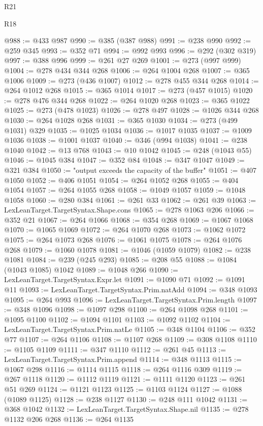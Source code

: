 \begin{lexlean}{R21}
\begin{lexlean}{R18}
\begin{coremodule}
{{{{{{{{{{{{{{{{{{{{{{{{{{{{{{{{{{{{{{{{{{{{{{{{{{{{{{{{{{{{{{{{{{{{{{{{{{{{{{{{{{{{{{{{{{{{{{{{{{{{{{{{{{{{{{{{{{{{{{{{{{{{{{{{{{{{{{{{{{{{{{{@988 := @433 @987
@990 := @385 (@387 @988)
@991 := @238 @990
@992 := @259 @345
@993 := @352 @71
@994 := @992 @993
@996 := @292 (@302 @319)
@997 := @388 @996
@999 := @261 @27 @269
@1001 := @273 (@997 @999)
@1004 := @278 @434 @344 @268
@1006 := @264 @1004 @268
@1007 := @365 @1006
@1009 := @273 (@436 @1007)
@1012 := @278 @455 @344 @268
@1014 := @264 @1012 @268
@1015 := @365 @1014
@1017 := @273 (@457 @1015)
@1020 := @278 @476 @344 @268
@1022 := @264 @1020 @268
@1023 := @365 @1022
@1025 := @273 (@478 @1023)
@1026 := @278 @497
@1028 := @1026 @344 @268
@1030 := @264 @1028 @268
@1031 := @365 @1030
@1034 := @273 (@499 @1031) @329
@1035 := @1025 @1034
@1036 := @1017 @1035
@1037 := @1009 @1036
@1038 := @1001 @1037
@1040 := @346 (@994 @1038)
@1041 := @238 @1040
@1042 := @13 @768
@1043 := @10 @1042
@1045 := @248 (@1043 @55)
@1046 := @1045 @384
@1047 := @352 @84
@1048 := @347 @1047
@1049 := @321 @384
@1050 := "output exceeds the capacity of the buffer"
@1051 := @407 @1050
@1052 := @406 @1051
@1054 := @264 @1052 @268
@1055 := @404 @1054
@1057 := @264 @1055 @268
@1058 := @1049 @1057
@1059 := @1048 @1058
@1060 := @280 @384
@1061 := @261 @33
@1062 := @261 @39
@1063 := LexLeanTarget.TargetSyntax.Shape.cons
@1065 := @278 @1063 @206
@1066 := @352 @21
@1067 := @264 @1066
@1068 := @354 @268
@1069 := @1067 @1068
@1070 := @1065 @1069
@1072 := @264 @1070 @268
@1073 := @1062 @1072
@1075 := @264 @1073 @268
@1076 := @1061 @1075
@1078 := @264 @1076 @268
@1079 := @1060 @1078
@1081 := @1046 (@1059 @1079)
@1082 := @238 @1081
@1084 := @239 (@245 @293)
@1085 := @208 @55
@1088 := @1084 (@1043 @1085) @1042
@1089 := @1048 @266
@1090 := LexLeanTarget.TargetSyntax.Expr.let
@1091 := @1090 @71
@1092 := @1091 @11
@1093 := LexLeanTarget.TargetSyntax.Prim.natAdd
@1094 := @348 @1093
@1095 := @264 @993
@1096 := LexLeanTarget.TargetSyntax.Prim.length
@1097 := @348 @1096
@1098 := @1097 @298
@1100 := @264 @1098 @268
@1101 := @1095 @1100
@1102 := @1094 @1101
@1103 := @1092 @1102
@1104 := LexLeanTarget.TargetSyntax.Prim.natLe
@1105 := @348 @1104
@1106 := @352 @77
@1107 := @264 @1106
@1108 := @1107 @268
@1109 := @308 @1108
@1110 := @1105 @1109
@1111 := @347 @1110
@1112 := @261 @45
@1113 := LexLeanTarget.TargetSyntax.Prim.append
@1114 := @348 @1113
@1115 := @1067 @298
@1116 := @1114 @1115
@1118 := @264 @1116 @309
@1119 := @267 @1118
@1120 := @1112 @1119
@1121 := @1111 @1120
@1123 := @261 @51 @269
@1124 := @1121 @1123
@1125 := @1103 @1124
@1127 := @1088 (@1089 @1125)
@1128 := @238 @1127
@1130 := @248 @111 @1042
@1131 := @368 @1042
@1132 := LexLeanTarget.TargetSyntax.Shape.nil
@1135 := @278 @1132 @206 @268
@1136 := @264 @1135
}}}}}}}}}}}}}}}}}}}}}}}}}}}}}}}}}}}}}}}}}}}}}}}}}}}}}}}}}}}}}}}}}}}}}}}}}}}}}}}}}}}}}}}}}}}}}}}}}}}}}}}}}}}}}}}}}}}}}}}}}}}}}}}}}}}}}}}}}}}}}}}
\end{coremodule}
\end{lexlean}
\end{lexlean}
